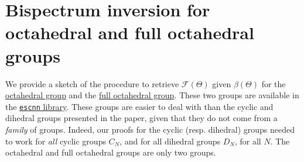 \documentclass{article}
\theoremstyle{plain}
\theoremstyle{definition}
\theoremstyle{remark}
\begin{document}
\section{Bispectrum inversion for octahedral and full octahedral groups}
We provide a sketch of the procedure to retrieve $\mathcal{F}(\Theta)$ given $\beta(\Theta)$ for the \href{https://en.wikipedia.org/wiki/Octahedral_symmetry}{octahedral group} and the \href{https://en.wikiversity.org/wiki/Full_octahedral_group}{full octahedral group}. These two groups are available in the \href{https://quva-lab.github.io/escnn/api/escnn.group.html}{\texttt{escnn} library}. These groups are easier to deal with than the cyclic and dihedral groups presented in the paper, given that they do not come from a \textit{family} of groups. Indeed, our proofs for the cyclic (resp. dihedral) groups needed to work for \textit{all} cyclic groups $C_N$, and for all dihedral groups $D_N$, for all $N$. The octahedral and full octahedral groups are only two groups.
\end{document}
